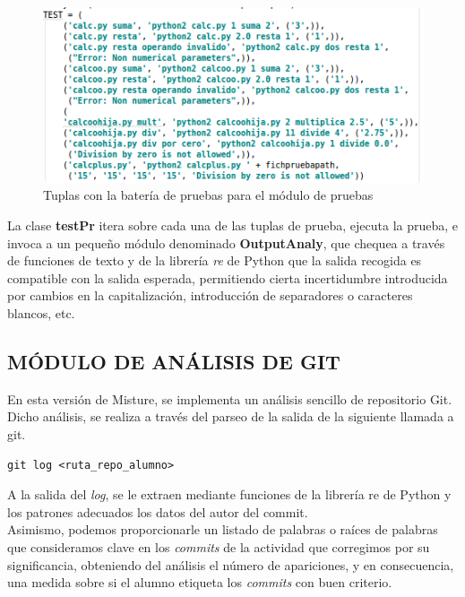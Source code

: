 \begin{figure}[H]
   \centering
   \includegraphics[width=16cm]{img/Selection_024_testcodigo}
   \caption{Tuplas con la batería de pruebas para el módulo de pruebas}
   \label{figura:testcodigo}
\end{figure}

La clase \textbf{testPr} itera sobre cada una de las tuplas de prueba, ejecuta la prueba, e invoca a un pequeño módulo denominado \textbf{OutputAnaly}, que chequea a través de funciones de texto y de la librería \textit{re} de Python que la salida recogida es compatible con la salida esperada, permitiendo cierta incertidumbre introducida por cambios en la capitalización, introducción de separadores o caracteres blancos, etc.

\subsection{MÓDULO DE ANÁLISIS DE GIT}


En esta versión de Misture, se implementa un análisis sencillo de repositorio Git. Dicho análisis, se realiza a través del parseo de la salida de la siguiente llamada a git.
\begin{verbatim}
git log <ruta_repo_alumno>
\end{verbatim}
A la salida del \textit{log}, se le extraen mediante funciones de la librería re de Python y los patrones adecuados los datos del autor del commit.\\


Asimismo, podemos proporcionarle un listado de palabras o raíces de palabras que consideramos clave en los \textit{commits} de la actividad que corregimos por su significancia, obteniendo  del análisis el número de apariciones, y en consecuencia, una medida sobre si el alumno etiqueta los \textit{commits} con buen criterio.


